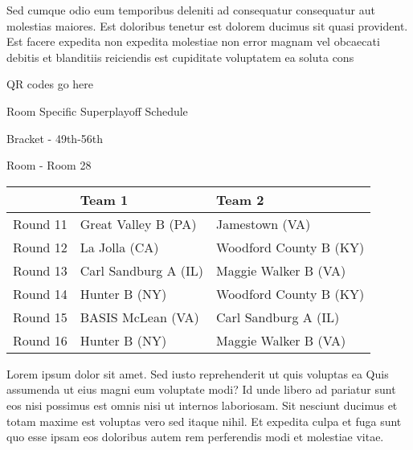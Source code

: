 \documentclass{article}%
\begin{document}
\newline%
    Sed cumque odio eum temporibus deleniti ad consequatur consequatur aut molestias maiores. Est doloribus tenetur est dolorem ducimus sit quasi provident. Est facere expedita non expedita molestiae non error magnam vel obcaecati debitis et blanditiis reiciendis est cupiditate voluptatem ea soluta cons%
\vspace*{140pt}%
\begin{center}%
\begin{Huge}%
QR codes go here%
\end{Huge}%
\end{center}%
\newpage%
\begin{center}%
\begin{Huge}%
Room Specific Superplayoff Schedule%
\end{Huge}%
\vspace*{8pt}%
\linebreak%
\begin{Large}%
Bracket {-} 49th{-}56th%
\end{Large}%
\vspace*{8pt}%
\linebreak%
\vspace*{8pt}%
\begin{Large}%
Room {-} Room 28%
\end{Large}%
\end{center}%
%
\begin{tabularx}{\textwidth}{|c|Y|Y|}%
\hline%
&Team 1&Team 2\\%
\hline%
Round 11&Great Valley B (PA)&Jamestown (VA)\\%
Round 12&La Jolla (CA)&Woodford County B (KY)\\%
Round 13&Carl Sandburg A (IL)&Maggie Walker B (VA)\\%
Round 14&Hunter B (NY)&Woodford County B (KY)\\%
Round 15&BASIS McLean (VA)&Carl Sandburg A (IL)\\%
Round 16&Hunter B (NY)&Maggie Walker B (VA)\\%
\hline%
\end{tabularx}%
\vspace*{8pt}%
\newline%
    Lorem ipsum dolor sit amet. Sed iusto reprehenderit ut quis voluptas ea Quis assumenda ut eius magni eum voluptate modi? Id unde libero ad pariatur sunt eos nisi possimus est omnis nisi ut internos laboriosam. Sit nesciunt ducimus et totam maxime est voluptas vero sed itaque nihil. Et expedita culpa et fuga sunt quo esse ipsam eos doloribus autem rem perferendis modi et molestiae vitae.\newline%
\end{document}
